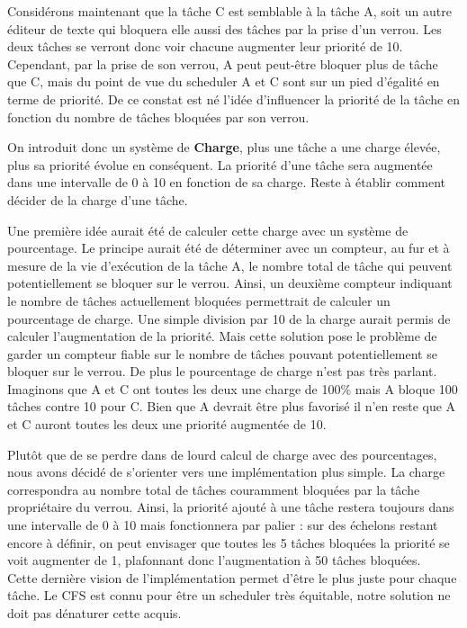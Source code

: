 Considérons maintenant que la tâche C est semblable à la tâche A, soit un autre éditeur de texte qui bloquera elle aussi des tâches par la prise d'un verrou. Les deux tâches se verront donc voir chacune augmenter leur priorité de 10. Cependant, par la prise de son verrou, A peut peut-être bloquer plus de tâche que C, mais du point de vue du scheduler A et C sont sur un pied d'égalité en terme de priorité. De ce constat est né l'idée d'influencer la priorité de la tâche en fonction du nombre de tâches bloquées par son verrou. 

On introduit donc un système de \textbf{Charge}, plus une tâche a une charge élevée, plus sa priorité évolue en conséquent. La priorité d'une tâche sera augmentée dans une intervalle de 0 à 10 en fonction de sa charge. Reste à établir comment décider de la charge d'une tâche. 

Une première idée aurait été de calculer cette charge avec un système de pourcentage. Le principe aurait été de déterminer avec un compteur, au fur et à mesure de la vie d'exécution de la tâche A, le nombre total de tâche qui peuvent potentiellement se bloquer sur le verrou. Ainsi, un deuxième compteur indiquant le nombre de tâches actuellement bloquées permettrait de calculer un pourcentage de charge. Une simple division par 10 de la charge aurait permis de calculer l'augmentation de la priorité. Mais cette solution pose le problème de garder un compteur fiable sur le nombre de tâches pouvant potentiellement se bloquer sur le verrou. De plus le pourcentage de charge n'est pas très parlant. Imaginons que A et C ont toutes les deux une charge de 100\% mais A bloque 100 tâches contre 10 pour C. Bien que A devrait être plus favorisé il n'en reste que A et C auront toutes les deux une priorité augmentée de 10.

Plutôt que de se perdre dans de lourd calcul de charge avec des pourcentages, nous avons décidé de s'orienter vers une implémentation plus simple. La charge correspondra au nombre total de tâches couramment bloquées par la tâche propriétaire du verrou. Ainsi, la priorité ajouté à une tâche restera toujours dans une intervalle de 0 à 10 mais fonctionnera par palier : sur des échelons restant encore à définir, on peut envisager que toutes les 5 tâches bloquées la priorité se voit augmenter de 1, plafonnant donc l'augmentation à 50 tâches bloquées.
\\

Cette dernière vision de l'implémentation permet d'être le plus juste pour chaque tâche. Le CFS est connu pour être un scheduler très équitable, notre solution ne doit pas dénaturer cette acquis.

